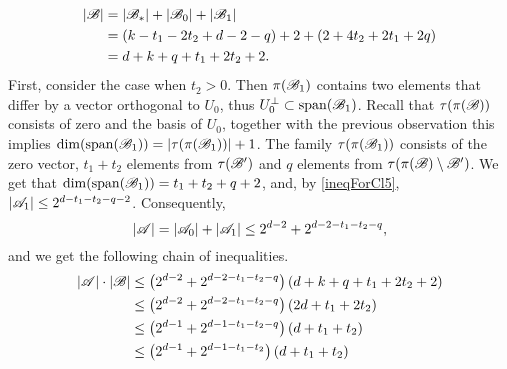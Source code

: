 \begin{enumerate}
\begin{enumerate}
\begin{enumerate}
                \begin{equation*}
                    \begin{split}
                        \left|{\mathscr{B}}\right|
                        & = \left|{\mathscr{B}}_*\right|+\left|{\mathscr{B}}_0\right|+\left|{\mathscr{B}}_1\right| \\
                        & = (k-t_1-2t_2+d-2-q)+2+(2+4t_2+2t_1+2q) \\ 
                        & = d + k + q + t_1 + 2t_2 + 2.
                    \end{split}
                \end{equation*}
                First, consider the case when $t_2 > 0$. Then $\pi({\mathscr{B}}_1)$ contains two elements that differ by a vector orthogonal to $U_0$, thus $U_0^\bot\subset\operatorname{span}({\mathscr{B}}_1)$. Recall that $\tau(\pi({\mathscr{B}}))$ consists of zero and the basis of $U_0$, together with the previous observation this implies $\operatorname{dim}(\operatorname{span}({\mathscr{B}}_1)) = |\tau(\pi({\mathscr{B}}_1))|+1$. The family $\tau(\pi({\mathscr{B}}_1))$ consists of the zero vector,  $t_1 + t_2$ elements from $\tau({\mathscr{B}}')$ and $q$ elements from $\tau(\pi({\mathscr{B}}) \setminus {\mathscr{B}}')$. We get that $\operatorname{dim}(\operatorname{span}({\mathscr{B}}_1)) = t_1+t_2+q+2$, and, by \eqref{ineqForCl5}, $|{\mathscr{A}}_1|\leq2^{d-t_1-t_2-q-2}$. Consequently,  $$|{\mathscr{A}}|= |{\mathscr{A}}_0| + |{\mathscr{A}}_1| \leq 2^{d-2} + 2^{d-2-t_1-t_2-q},$$ and we get the following chain of inequalities.
                \begin{align}
                    \left|\aaa\right|\cdot\left|\bb\right| 
                    & \leq \left(2^{d-2} + 2^{d-2-t_1-t_2-q}\right)\left(d+k+q+t_1+2t_2+2\right) \nonumber \\ 
                    & \leq \left(2^{d-2} + 2^{d-2-t_1-t_2-q}\right)\left(2d+t_1+2t_2\right) \label{mid1} \\
                    & \leq \left(2^{d-1} + 2^{d-1-t_1-t_2-q}\right)\left(d+t_1+t_2\right) \nonumber \\
                    & \leq \left(2^{d-1} + 2^{d-1-t_1-t_2}\right)\left(d+t_1+t_2\right) \label{mid2} \\

\end{align}
\end{enumerate}
\end{enumerate}
\end{enumerate}
